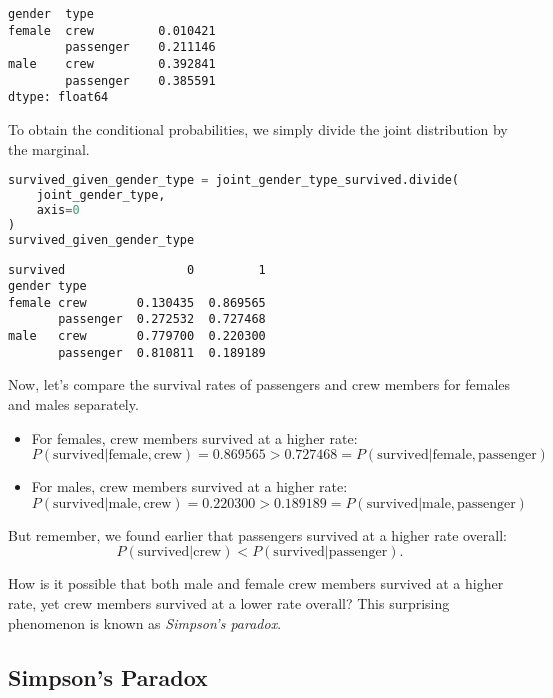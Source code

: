 \small\begin{verbatim}
gender  type     
female  crew         0.010421
        passenger    0.211146
male    crew         0.392841
        passenger    0.385591
dtype: float64
\end{verbatim}



To obtain the conditional probabilities, we simply divide the joint distribution by the marginal.

\begin{lstlisting}[language=Python]
survived_given_gender_type = joint_gender_type_survived.divide(
    joint_gender_type,
    axis=0
)
survived_given_gender_type
\end{lstlisting}

\small\begin{verbatim}
survived                 0         1
gender type                         
female crew       0.130435  0.869565
       passenger  0.272532  0.727468
male   crew       0.779700  0.220300
       passenger  0.810811  0.189189
\end{verbatim}



Now, let's compare the survival rates of passengers and crew members for females and males separately.
\begin{itemize}
\item 
For females, crew members survived at a higher rate:
$$ P(\text{survived} | \text{female}, \text{crew}) = 0.869565 > 0.727468 = P(\text{survived} | \text{female}, \text{passenger}) $$

\item 
For males, crew members survived at a higher rate:
$$ P(\text{survived} | \text{male}, \text{crew}) = 0.220300 > 0.189189 = P(\text{survived} | \text{male}, \text{passenger}) $$

\end{itemize}

But remember, we found earlier that passengers survived at a higher rate overall:
$$ P(\text{survived} | \text{crew}) < P(\text{survived} | \text{passenger}). $$

How is it possible that both male and female crew members survived at a higher rate, yet crew members survived at a lower rate overall? This surprising phenomenon is known as \textit{Simpson's paradox}.



\subsection{Simpson's Paradox}\label{2.3.3}

